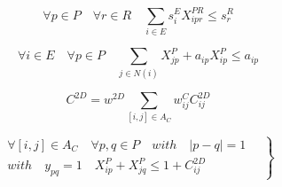 \documentclass[a4paper,french,10pt]{report}
\begin{document}
	\begin{equation}
	    \forall p\in P\quad\forall r\in R\quad\sum_{i\in E}s^E_iX^{PR}_{ipr} \leq s^R_r
	\label{equation4}
	\end{equation}
	
    \begin{equation}
        \forall i\in E \quad\forall p\in P \quad \sum_{j\in N(i)}X^{P}_{jp} + a_{ip}X^P_{ip}\leq a_{ip}
    \label{equation5}
    \end{equation}
    
    \begin{equation}
        C^{2D} = w^{2D}\sum_{[i,j]\in A_C} w^C_{ij}C^{2D}_{ij}
    \label{equation6}
    \end{equation}
    
    \begin{equation}
        \left.
        \begin{aligned}
        \forall [i,j]\in A_C\quad\forall p,q\in P\quad with \quad|p-q|=1 \quad\\
        with\quad y_{pq}=1\quad X^P_{ip}+X^P_{jq}\leq 1+C^{2D}_{ij}\quad     
        \end{aligned}
        \right\}
    \label{equation7}
    \end{equation}\par
    
\end{document}

